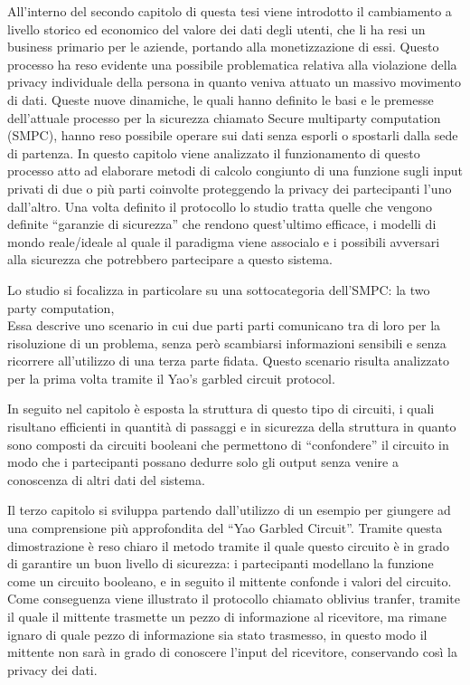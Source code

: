 \documentclass[
]{book}
\begin{document}
All'interno del secondo capitolo di questa tesi viene introdotto il cambiamento a livello storico ed economico del valore dei dati degli utenti, che li ha resi un business primario per le aziende, portando alla monetizzazione di essi. Questo processo ha reso evidente una possibile problematica relativa alla violazione della privacy individuale della persona in quanto veniva attuato un massivo movimento di dati. Queste nuove dinamiche, le quali hanno definito le basi e le premesse dell'attuale processo per la sicurezza chiamato Secure multiparty computation (SMPC), hanno reso possibile operare sui dati senza esporli o spostarli dalla sede di partenza. In questo capitolo viene analizzato il funzionamento di questo processo atto ad elaborare metodi di calcolo congiunto di una funzione sugli input privati di due o più parti coinvolte proteggendo la privacy dei partecipanti l'uno dall'altro.
Una volta definito il protocollo lo studio tratta quelle che vengono definite ``garanzie di sicurezza'' che rendono quest'ultimo efficace, i modelli di mondo reale/ideale al quale il paradigma viene associalo e i possibili avversari alla sicurezza che potrebbero partecipare a questo sistema.

Lo studio si focalizza in particolare su una sottocategoria dell'SMPC: la two party computation,\\
Essa descrive uno scenario in cui due parti parti comunicano tra di loro per la risoluzione di un problema, senza però scambiarsi informazioni sensibili e senza ricorrere all'utilizzo di una terza parte fidata. Questo scenario risulta analizzato per la prima volta tramite il Yao's garbled circuit protocol.

In seguito nel capitolo è esposta la struttura di questo tipo di circuiti, i quali risultano efficienti in quantità di passaggi e in sicurezza della struttura in quanto sono composti da circuiti booleani che permettono di ``confondere'' il circuito in modo che i partecipanti possano dedurre solo gli output senza venire a conoscenza di altri dati del sistema.

\newpage

Il terzo capitolo si sviluppa partendo dall'utilizzo di un esempio per giungere ad una comprensione più approfondita del ``Yao Garbled Circuit''. Tramite questa dimostrazione è reso chiaro il metodo tramite il quale questo circuito è in grado di garantire un buon livello di sicurezza: i partecipanti modellano la funzione come un circuito booleano, e in seguito il mittente confonde i valori del circuito. Come conseguenza viene illustrato il protocollo chiamato oblivius tranfer, tramite il quale il mittente trasmette un pezzo di informazione al ricevitore, ma rimane ignaro di quale pezzo di informazione sia stato trasmesso, in questo modo il mittente non sarà in grado di conoscere l'input del ricevitore, conservando così la privacy dei dati.
\end{document}
